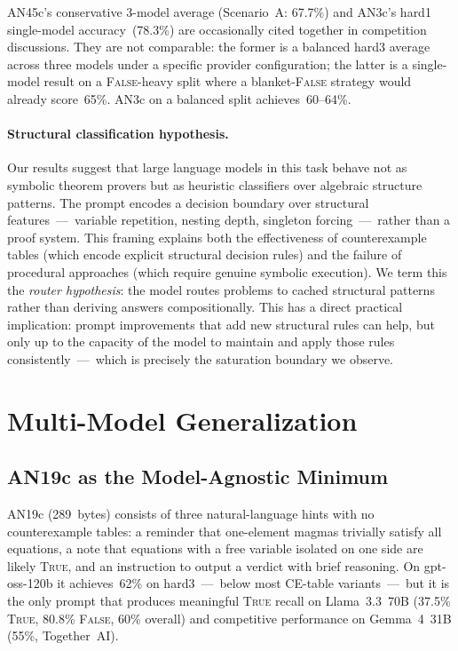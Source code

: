 \documentclass[11pt]{article}
\begin{document}
AN45c's conservative 3-model average (Scenario~A: 67.7\%) and AN3c's
hard1 single-model accuracy~(78.3\%) are occasionally cited together in
competition discussions. They are not comparable: the former is a
balanced hard3 average across three models under a specific provider
configuration; the latter is a single-model result on a
\textsc{False}-heavy split where a blanket-\textsc{False} strategy
would already score~65\%. AN3c on a balanced split achieves~60--64\%.

\paragraph{Structural classification hypothesis.}
Our results suggest that large language models in this task behave not
as symbolic theorem provers but as heuristic classifiers over algebraic
structure patterns. The prompt encodes a decision boundary over
structural features~---~variable repetition, nesting depth, singleton
forcing~---~rather than a proof system. This framing explains both the
effectiveness of counterexample tables (which encode explicit structural
decision rules) and the failure of procedural approaches (which require
genuine symbolic execution). We term this the \emph{router hypothesis}:
the model routes problems to cached structural patterns rather than
deriving answers compositionally. This has a direct practical implication:
prompt improvements that add new structural rules can help, but only up
to the capacity of the model to maintain and apply those rules
consistently~---~which is precisely the saturation boundary we observe.

\section{Multi-Model Generalization}
\label{sec:multimodel}

\subsection{AN19c as the Model-Agnostic Minimum}

AN19c (289~bytes) consists of three natural-language hints with no
counterexample tables: a reminder that one-element magmas trivially
satisfy all equations, a note that equations with a free variable
isolated on one side are likely \textsc{True}, and an instruction to
output a verdict with brief reasoning. On gpt-oss-120b it achieves~62\%
on hard3~---~below most CE-table variants~---~but it is the only prompt
that produces meaningful \textsc{True} recall on Llama~3.3~70B (37.5\%
\textsc{True}, 80.8\% \textsc{False}, 60\% overall) and competitive
performance on Gemma~4~31B (55\%, Together~AI).
\end{document}
